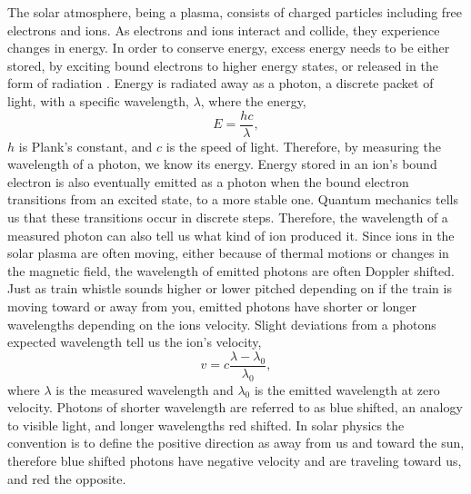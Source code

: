 The solar atmosphere, being a plasma, consists of charged particles including free electrons and ions.
As electrons and ions interact and collide, they experience changes in energy. 
In order to conserve energy, excess energy needs to be either stored, by exciting bound electrons to higher energy states, or released in the form of radiation .
Energy is radiated away as a photon, a discrete packet of light, with a specific wavelength, $\lambda$, where the energy,
\begin{equation}
	E = \frac{hc}{\lambda},
\end{equation}
$h$ is Plank's constant, and $c$ is the speed of light.
Therefore, by measuring the wavelength of a photon, we know its energy.
Energy stored in an ion's bound electron is also eventually emitted as a photon when the bound electron transitions from an excited state, to a more stable one.
Quantum mechanics tells us that these transitions occur in discrete steps.
Therefore,  the wavelength of a measured photon can also tell us what kind of ion produced it.
Since ions in the solar plasma are often moving, either because of thermal motions or changes in the magnetic field, the wavelength of emitted photons are often Doppler shifted.  
Just as train whistle sounds higher or lower pitched depending on if the train is moving toward or away from you, emitted photons have shorter or longer wavelengths depending on the ions velocity.
Slight deviations from a photons expected wavelength tell us the ion's velocity,
\begin{equation}
	v = c \frac{\lambda - \lambda_0}{\lambda_0},
\end{equation}
where $\lambda$ is the measured wavelength and $\lambda_0$ is the emitted wavelength at zero velocity.
Photons of shorter wavelength are referred to as blue shifted, an analogy to visible light, and longer wavelengths red shifted.
In solar physics the convention is to define the positive direction as away from us and toward the sun, therefore blue shifted photons have negative velocity and are traveling toward us, and red the opposite.

